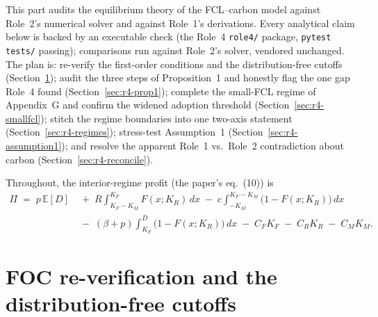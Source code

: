 %

\label{part:role4}

This part audits the equilibrium theory of the FCL--carbon model against Role~2's
numerical solver and against Role~1's derivations. Every analytical claim below is
backed by an executable check (the Role~4 \texttt{role4/} package, \texttt{pytest
tests/} passing); comparisons run against Role~2's solver, vendored unchanged. The
plan is: re-verify the first-order conditions and the distribution-free cutoffs
(Section~\ref{sec:r4-foc}); audit the three steps of Proposition~1 and honestly flag
the one gap Role~4 found (Section~\ref{sec:r4-prop1}); complete the small-FCL regime
of Appendix~G and confirm the widened adoption threshold
(Section~\ref{sec:r4-smallfcl}); stitch the regime boundaries into one two-axis
statement (Section~\ref{sec:r4-regimes}); stress-test Assumption~1
(Section~\ref{sec:r4-assumption1}); and resolve the apparent Role~1 vs.\ Role~2
contradiction about carbon (Section~\ref{sec:r4-reconcile}).

Throughout, the interior-regime profit (the paper's eq.~(10)) is
\begin{equation}
\label{eq:r4-profit}
\begin{aligned}
\Pi \;=\; p\,\mathbb{E}[D]
&\;+\; R\!\int_{K_F-K_M}^{K_F}\! F(x;K_R)\,dx
\;-\; c\!\int_{-K_M}^{K_F-K_M}\!\bigl(1-F(x;K_R)\bigr)\,dx \\
&\;-\; (\beta+p)\!\int_{K_F}^{\bar D}\!\bigl(1-F(x;K_R)\bigr)\,dx
\;-\; C_F K_F \;-\; C_R K_R \;-\; C_M K_M .
\end{aligned}
\end{equation}

\section{FOC re-verification and the distribution-free cutoffs}
\label{sec:r4-foc}

